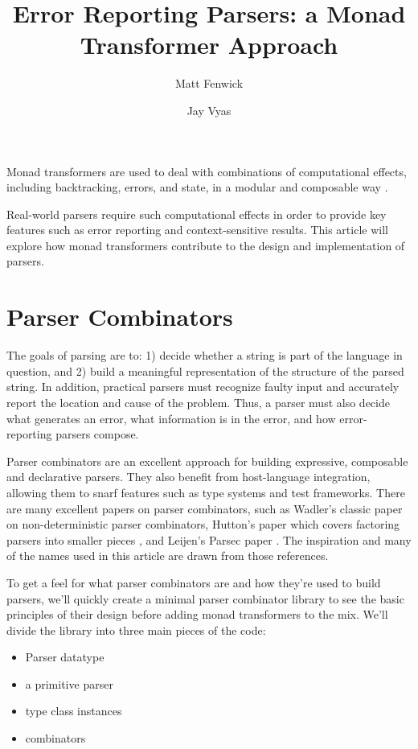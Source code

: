 \documentclass{tmr}
\title{Error Reporting Parsers:  a Monad Transformer Approach}
\author{Matt Fenwick\email{mfenwick100@gmail.com}}
\author{Jay Vyas\email{jayunit100@gmail.com}}
\begin{document}
\begin{introduction}

Monad transformers are used to deal with combinations of computational
effects, including backtracking, errors, and state, in a modular and
composable way \cite{liang}.

Real-world parsers require such computational effects in order to provide
key features such as error reporting and context-sensitive results.
This article will explore how monad transformers contribute to the design
and implementation of parsers.

\end{introduction}



\section{Parser Combinators}

The goals of parsing are to: 1) decide whether a string is part of the language
in question, and 2) build a meaningful representation of the structure of the
parsed string.  In addition, practical parsers must recognize faulty input and
accurately report the location and cause of the problem.  Thus, a parser must
also decide what generates an error, what information is in the error, and how
error-reporting parsers compose.

Parser combinators are an excellent approach for building expressive, 
composable and declarative parsers.  They also benefit from host-language
integration, allowing them to snarf features such as type systems and test 
frameworks.  There are many excellent papers on parser combinators, such
as Wadler's classic paper \cite{wadler} on non-deterministic parser combinators, 
Hutton's paper which covers factoring parsers into smaller pieces \cite{hutton}, 
and Leijen's Parsec paper \cite{leijen}.  The inspiration and many of the names 
used in this article are drawn from those references.

To get a feel for what parser combinators are and how they're used to
build parsers, we'll quickly create a minimal parser combinator library to see
the basic principles of their design before adding monad transformers to
the mix.  We'll divide the library into three main pieces of the code:

\begin{itemize}
 \item Parser datatype
 \item a primitive parser
 \item type class instances
 \item combinators
\end{itemize}
\end{document}
